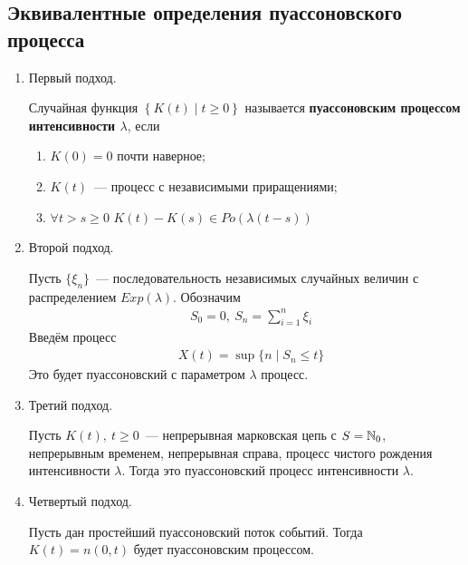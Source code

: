 \subsection{Эквивалентные определения пуассоновского процесса}
\begin{enumerate}
    \item Первый подход.
    \begin{Def}
        Случайная функция $\left\{ K(t) \mid t \geq 0 \right\}$ называется
        \textbf{пуассоновским процессом интенсивности $\lambda$}, если
        \begin{enumerate}
            \item $K(0) = 0$ почти наверное;
            \item $K(t)$~--- процесс с независимыми приращениями;
            \item $\forall t > s \geq 0$ $K(t) - K(s) \in Po(\lambda(t-s))$
        \end{enumerate}
    \end{Def}
    \item Второй подход.
    \begin{Def} Пусть $\{\xi_n\}$~--- последовательность независимых случайных
        величин с распределением $Exp(\lambda)$. Обозначим
        \begin{align*}
          & S_0 = 0, \ S_n = \sum_{i=1}^n \xi_i
        \end{align*}
        Введём процесс
        \begin{align*}
          & X(t) = \sup \{n \mid S_n \leq t\}
        \end{align*}
        Это будет пуассоновский с параметром $\lambda$ процесс.
    \end{Def}
    \item Третий подход.
    \begin{Def}
        Пусть $K(t), \ t \geq 0$~--- непрерывная марковская цепь с $S = \mathbb{N}_0$,
        непрерывным временем, непрерывная справа, процесс чистого рождения
        интенсивности $\lambda$. Тогда это пуассоновский процесс интенсивности
        $\lambda$.
    \end{Def}
    \item Четвертый подход.
    \begin{Def}
        Пусть дан простейший пуассоновский поток событий. Тогда $K(t) = n(0,t)$
        будет пуассоновским процессом.
    \end{Def}
\end{enumerate}